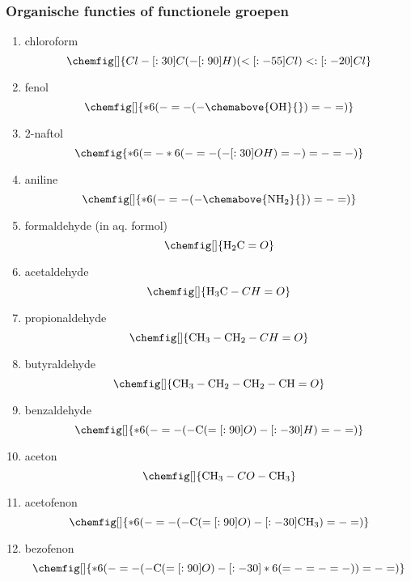 \documentclass[a4paper,12pt]{article}
\begin{document}
    \subsubsection{Organische functies of functionele groepen}
    \begin{enumerate}
        \item chloroform $$\chemfig[]{Cl-[:30]C(-[:90]H)(<[:-55]Cl)<:[:-20]Cl}$$
        \item fenol $$\chemfig[]{*6(-=-(-\chemabove{\ce{OH}}{})=-=)}$$
        \item 2-naftol $$\chemfig{*6(=-*6(-=-(-[:30]OH)=-)=-=-)}$$
        \item aniline $$\chemfig[]{*6(-=-(-\chemabove{\ce{NH2}}{})=-=)}$$
        \item formaldehyde (in aq. formol) $$\chemfig[]{\ce{H2C}=O}$$
        \item acetaldehyde $$\chemfig[]{\ce{H3C}-CH=O}$$
        \item propionaldehyde $$\chemfig[]{\ce{CH3}-\ce{CH2}-CH=O}$$
        \item butyraldehyde $$\chemfig[]{\ce{CH3}-\ce{CH2}-\ce{CH2}-\ce{CH}=O}$$
        \item benzaldehyde $$\chemfig[]{*6(-=-(-\ce{C}(=[:90]O)-[:-30]H)=-=)}$$
        \item aceton $$\chemfig[]{\ce{CH3}-CO-\ce{CH3}}$$
        \item acetofenon $$\chemfig[]{*6(-=-(-\ce{C}(=[:90]O)-[:-30]\ce{CH3})=-=)}$$
        \item bezofenon $$\chemfig[]{*6(-=-(-\ce{C}(=[:90]O)-[:-30]*6(=-=-=-))=-=)}$$
    \end{enumerate}
\end{document}
